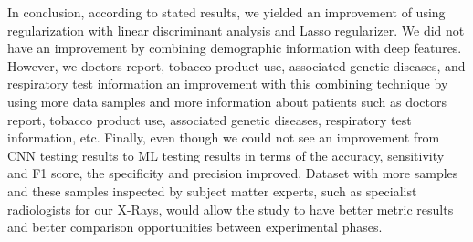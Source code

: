 In conclusion, according to stated results, we yielded an improvement of using regularization with linear discriminant analysis and Lasso regularizer. We did not have an improvement by combining demographic information with deep features. However, we doctors report, tobacco product use, associated genetic diseases, and respiratory test information an improvement with this combining technique by using more data samples and more information about patients such as doctors report, tobacco product use, associated genetic diseases, respiratory test information, etc. Finally, even though we could not see an improvement from CNN testing results to ML testing results in terms of the accuracy, sensitivity and F1 score, the specificity and precision improved. Dataset with more samples and these samples inspected by subject matter experts, such as specialist radiologists for our X-Rays, would allow the study to have better metric results and better comparison opportunities between experimental phases.